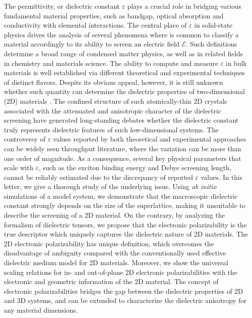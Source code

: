 The permittivity, or dielectric constant $\varepsilon$ plays a crucial
role in bridging various fundamental material properties, such as
bandgap\autocite{Moss_1950_relation,Moss_1985_n_Eg}, optical
absorption\autocite{Kittel_2005_introduction_book} and
conductivity\autocite{Dressel_2001_electrodynamics} with elemental
interactions.  The central place of $\varepsilon$ in solid-state
physics drives the analysis of several phenomena where is common to
classify a material accordingly to its ability to screen an electric
field $\mathscr{E}$. Such definitions determine a broad range of condensed
matter physics, as well as in related fields in chemistry and
materials science.  The ability to compute and measure $\varepsilon$
in bulk materials is well established via different theoretical
\autocite{Adler_1962_eps,Hybertsen_1987} and experimental techniques
\autocite{Palik_1998_handbook} of distinct flavors.
%
Despite its obvious appeal, however, it is still unknown whether such quantity can determine the 
dielectric properties of two-dimensional (2D) materials \autocite{Novoselov_2016_vdW}.  
%
The confined structure of such atomically-thin 2D crystals associated
with the attenuated and anisotropic character of the dielectric
screening
\autocite{Keldysh_1979_eps_multi,Sharma_1985_semiconductor_slab_eps,Low_2014_screening_BP,Cudazzo_2011_screening_2D,Bechstedt_2012_silicene,Cudazzo_2010_screen2D,Nazarov_2015_2D_3D}
have generated long-standing debates whether the dielectric constant
truly represents dielectric features of such low-dimensional systems.
The controversy of $\varepsilon$ values reported by both theoretical
and experimental approaches can be widely seen throughput
literature\autocite{Li_2016_screening_rev}, where the variation can be
more than one order of magnitude.
%
As a
consequence, several key physical parameters that scale with
$\varepsilon$, such as the exciton binding energy and Debye screening
length, cannot be reliably estimated due to the discrepancy of
reported $\varepsilon$ values. In this letter, we give a thorough
study of the underlying issue. Using \textit{ab initio} simulations of
a model system, we demonstrate that the macroscopic dielectric
constant strongly depends on the size of the superlattice, making it
unsuitable to describe the screening of a 2D material. On the
contrary, by analyzing the formalism of dielectric tensors, we propose
that the electronic polarizability is the true descriptor which
uniquely captures the dielectric nature of 2D materials. The 2D
electronic polarizability has unique definition, which overcomes the
disadvantage of ambiguity compared with the conventionally used
effective dielectric medium model for 2D materials. Moreover, we show
the universal scaling relations for in- and out-of-plane 2D electronic
polarizabilities with the electronic and geometric information of the
2D material. The concept of electronic polarizabilities bridges the
gap between the dielectric properties of 2D and 3D systems, and can be
extended to characterize the dielectric anisotropy for any material
dimensions.


